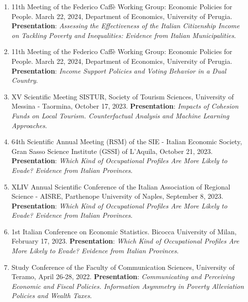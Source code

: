 \documentclass[11pt,a4paper,sans]{moderncv} %
\begin{document}
\begin{enumerate}[label=\arabic*.]
    \item 11th Meeting of the Federico Caffè Working Group: Economic Policies for People. March 22, 2024, Department of Economics, University of Perugia. \textbf{Presentation}: \textit{Assessing the Effectiveness of the Italian Citizenship Income on Tackling Poverty and Inequalities: Evidence from Italian Municipalities}.
        
    \item 11th Meeting of the Federico Caffè Working Group: Economic Policies for People. March 22, 2024, Department of Economics, University of Perugia. \textbf{Presentation}: \textit{Income Support Policies and Voting Behavior in a Dual Country}.
        
    \item XV Scientific Meeting SISTUR, Society of Tourism Sciences, University of Messina - Taormina, October 17, 2023. \textbf{Presentation}: \textit{Impacts of Cohesion Funds on Local Tourism. Counterfactual Analysis and Machine Learning Approaches}.
        
        \item 64th Scientific Annual Meeting (RSM) of the SIE - Italian Economic Society, Gran Sasso Science Institute (GSSI) of L'Aquila, October 21, 2023. \textbf{Presentation}: \textit{Which Kind of Occupational Profiles Are More Likely to Evade? Evidence from Italian Provinces}.
        
        \item XLIV Annual Scientific Conference of the Italian Association of Regional Science - AISRE, Parthenope University of Naples, September 8, 2023. \textbf{Presentation}: \textit{Which Kind of Occupational Profiles Are More Likely to Evade? Evidence from Italian Provinces}.
        
    \item 1st Italian Conference on Economic Statistics. Bicocca University of Milan, February 17, 2023. \textbf{Presentation}: \textit{Which Kind of Occupational Profiles Are More Likely to Evade? Evidence from Italian Provinces}.
    
    \item Study Conference of the Faculty of Communication Sciences, University of Teramo, April 26-28, 2022. \textbf{Presentation}: \textit{Communicating and Perceiving Economic and Fiscal Policies. Information Asymmetry in Poverty Alleviation Policies and Wealth Taxes}.
    
\end{enumerate}
\end{document}

